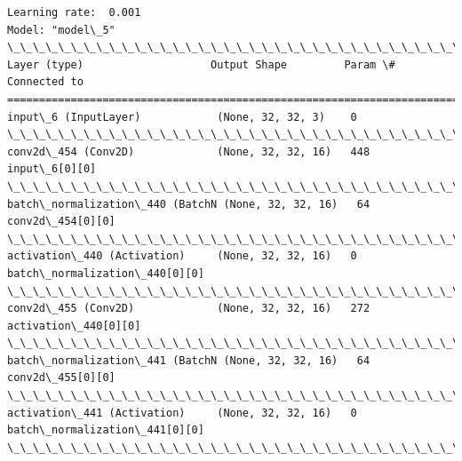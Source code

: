\documentclass[11pt]{article}
\begin{document}
    \begin{Verbatim}[commandchars=\\\{\}]
Learning rate:  0.001
Model: "model\_5"
\_\_\_\_\_\_\_\_\_\_\_\_\_\_\_\_\_\_\_\_\_\_\_\_\_\_\_\_\_\_\_\_\_\_\_\_\_\_\_\_\_\_\_\_\_\_\_\_\_\_\_\_\_\_\_\_\_\_\_\_\_\_\_\_\_\_\_\_\_\_\_\_\_\_\_\_\_\_\_\_\_\_\_\_\_\_\_\_\_\_\_\_\_\_\_\_\_\_
Layer (type)                    Output Shape         Param \#     Connected to                     
==================================================================================================
input\_6 (InputLayer)            (None, 32, 32, 3)    0                                            
\_\_\_\_\_\_\_\_\_\_\_\_\_\_\_\_\_\_\_\_\_\_\_\_\_\_\_\_\_\_\_\_\_\_\_\_\_\_\_\_\_\_\_\_\_\_\_\_\_\_\_\_\_\_\_\_\_\_\_\_\_\_\_\_\_\_\_\_\_\_\_\_\_\_\_\_\_\_\_\_\_\_\_\_\_\_\_\_\_\_\_\_\_\_\_\_\_\_
conv2d\_454 (Conv2D)             (None, 32, 32, 16)   448         input\_6[0][0]                    
\_\_\_\_\_\_\_\_\_\_\_\_\_\_\_\_\_\_\_\_\_\_\_\_\_\_\_\_\_\_\_\_\_\_\_\_\_\_\_\_\_\_\_\_\_\_\_\_\_\_\_\_\_\_\_\_\_\_\_\_\_\_\_\_\_\_\_\_\_\_\_\_\_\_\_\_\_\_\_\_\_\_\_\_\_\_\_\_\_\_\_\_\_\_\_\_\_\_
batch\_normalization\_440 (BatchN (None, 32, 32, 16)   64          conv2d\_454[0][0]                 
\_\_\_\_\_\_\_\_\_\_\_\_\_\_\_\_\_\_\_\_\_\_\_\_\_\_\_\_\_\_\_\_\_\_\_\_\_\_\_\_\_\_\_\_\_\_\_\_\_\_\_\_\_\_\_\_\_\_\_\_\_\_\_\_\_\_\_\_\_\_\_\_\_\_\_\_\_\_\_\_\_\_\_\_\_\_\_\_\_\_\_\_\_\_\_\_\_\_
activation\_440 (Activation)     (None, 32, 32, 16)   0           batch\_normalization\_440[0][0]    
\_\_\_\_\_\_\_\_\_\_\_\_\_\_\_\_\_\_\_\_\_\_\_\_\_\_\_\_\_\_\_\_\_\_\_\_\_\_\_\_\_\_\_\_\_\_\_\_\_\_\_\_\_\_\_\_\_\_\_\_\_\_\_\_\_\_\_\_\_\_\_\_\_\_\_\_\_\_\_\_\_\_\_\_\_\_\_\_\_\_\_\_\_\_\_\_\_\_
conv2d\_455 (Conv2D)             (None, 32, 32, 16)   272         activation\_440[0][0]             
\_\_\_\_\_\_\_\_\_\_\_\_\_\_\_\_\_\_\_\_\_\_\_\_\_\_\_\_\_\_\_\_\_\_\_\_\_\_\_\_\_\_\_\_\_\_\_\_\_\_\_\_\_\_\_\_\_\_\_\_\_\_\_\_\_\_\_\_\_\_\_\_\_\_\_\_\_\_\_\_\_\_\_\_\_\_\_\_\_\_\_\_\_\_\_\_\_\_
batch\_normalization\_441 (BatchN (None, 32, 32, 16)   64          conv2d\_455[0][0]                 
\_\_\_\_\_\_\_\_\_\_\_\_\_\_\_\_\_\_\_\_\_\_\_\_\_\_\_\_\_\_\_\_\_\_\_\_\_\_\_\_\_\_\_\_\_\_\_\_\_\_\_\_\_\_\_\_\_\_\_\_\_\_\_\_\_\_\_\_\_\_\_\_\_\_\_\_\_\_\_\_\_\_\_\_\_\_\_\_\_\_\_\_\_\_\_\_\_\_
activation\_441 (Activation)     (None, 32, 32, 16)   0           batch\_normalization\_441[0][0]    
\_\_\_\_\_\_\_\_\_\_\_\_\_\_\_\_\_\_\_\_\_\_\_\_\_\_\_\_\_\_\_\_\_\_\_\_\_\_\_\_\_\_\_\_\_\_\_\_\_\_\_\_\_\_\_\_\_\_\_\_\_\_\_\_\_\_\_\_\_\_\_\_\_\_\_\_\_\_\_\_\_\_\_\_\_\_\_\_\_\_\_\_\_\_\_\_\_\_

\end{Verbatim}
\end{document}
